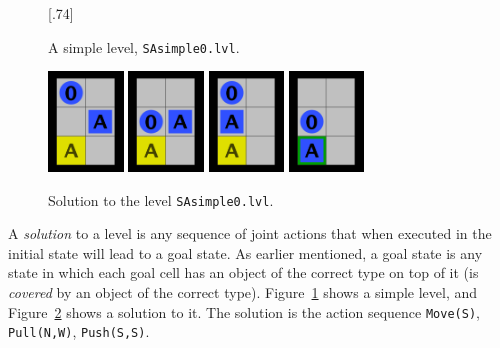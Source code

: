 \documentclass[12pt,a4paper]{article}
\newcommand{\showlevel}[2]{%
    \scalebox{1}[.74]{%
        \begin{minipage}{#2}
            \renewcommand{\baselinestretch}{0.8}
            
            \renewcommand{\baselinestretch}{1.0}
        \end{minipage}
    }
}
\begin{document}
\begin{figure}
\begin{center}
  \showlevel{levels/SAsimple0}{1.5cm}
\end{center}
\caption{A simple level, \texttt{SAsimple0.lvl}.}\label{figu:simple_level}
\end{figure}
\begin{figure}
\begin{center}
  \includegraphics[width=2cm]{simple0_1} 
\quad
\quad  
  \includegraphics[width=2cm]{simple0_2} 
\quad
\quad
  \includegraphics[width=2cm]{simple0_3} 
\quad
\quad
  \includegraphics[width=2cm]{simple0_4} 
  \end{center}
  \caption{Solution to the level \texttt{SAsimple0.lvl}.}\label{figu:simple_solution}
\end{figure}


A \emph{solution} to a level is any sequence of joint actions that when executed in the initial state will lead to a goal state. As earlier mentioned, a goal state is any state in which each goal cell has an object of the correct type on top of it (is \emph{covered} by an object of the correct type). Figure~\ref{figu:simple_level} shows a simple level, and Figure~\ref{figu:simple_solution} shows a solution to it. The solution is the action sequence \texttt{Move(S)}, \texttt{Pull(N,W)}, \texttt{Push(S,S)}.
\end{document}
